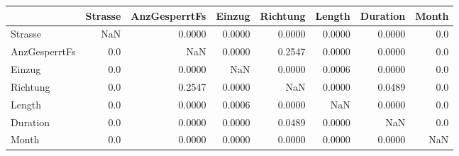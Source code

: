 \begin{tabular}{lrrrrrrr}
\toprule
{} &  Strasse &  AnzGesperrtFs &  Einzug &  Richtung &  Length &  Duration &  Month \\
\midrule
Strasse       &      NaN &         0.0000 &  0.0000 &    0.0000 &  0.0000 &    0.0000 &    0.0 \\
AnzGesperrtFs &      0.0 &            NaN &  0.0000 &    0.2547 &  0.0000 &    0.0000 &    0.0 \\
Einzug        &      0.0 &         0.0000 &     NaN &    0.0000 &  0.0006 &    0.0000 &    0.0 \\
Richtung      &      0.0 &         0.2547 &  0.0000 &       NaN &  0.0000 &    0.0489 &    0.0 \\
Length        &      0.0 &         0.0000 &  0.0006 &    0.0000 &     NaN &    0.0000 &    0.0 \\
Duration      &      0.0 &         0.0000 &  0.0000 &    0.0489 &  0.0000 &       NaN &    0.0 \\
Month         &      0.0 &         0.0000 &  0.0000 &    0.0000 &  0.0000 &    0.0000 &    NaN \\
\bottomrule
\end{tabular}
